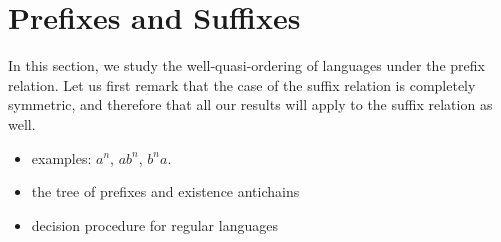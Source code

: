\section{Prefixes and Suffixes}
\label{prefixes-suffixes:sec}

In this section, we study the well-quasi-ordering of languages under the prefix
relation. Let us first remark that the case of the suffix relation is
completely symmetric, and therefore that all our results will apply to the
suffix relation as well.


\begin{itemize}
    \item examples: $a^n$, $ab^n$, $b^na$. 
    \item the tree of prefixes and existence antichains
    \item decision procedure for regular languages
\end{itemize}
